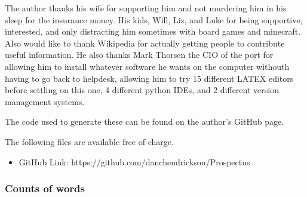 \documentclass[journal=jacsat,manuscript=article]{achemso}
\newcommand\wordcount{
	}
\begin{document}
\pagebreak
\begin{acknowledgement}

The author thanks his wife for supporting him and not murdering him in his sleep for the insurance money.  His kids, Will, Liz, and Luke for being supportive, interested, and only distracting him sometimes with board games and minecraft.  Also would like to thank Wikipedia for actually getting people to contribute useful information.  He also thanks Mark Thorsen the CIO of the port for allowing him to install whatever software he wants on the computer withouth having to go back to helpdesk, allowing him to try 15 different LATEX editors before settling on this one, 4 different python IDEs, and 2 different version management systems.

\end{acknowledgement}

\begin{suppinfo}

The code used to generate these can be found on the author's GitHub page.

The following files are available free of charge.
\begin{itemize}
  \item GitHub Link: https://github.com/danchendrickson/Prospectus
\end{itemize}

\end{suppinfo}


	
\subsubsection*{Counts of words} 
\wordcount

\end{document}

